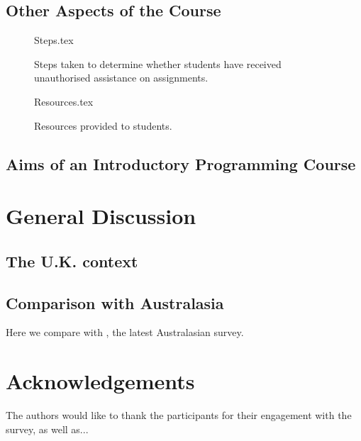 \documentclass{sig-alternate}
\begin{document}
\subsection{Other Aspects of the Course}

\begin{figure}
\begin{center}
{Steps.tex}
\end{center}
\caption{Steps taken to determine whether students have received unauthorised assistance on assignments.}
\end{figure}

\begin{figure}
\begin{center}
{Resources.tex}
\end{center}
\caption{Resources provided to students.}
\end{figure}
\subsection{Aims of an Introductory Programming Course}


\section{General Discussion}\label{discussion}

\subsection{The U.K. context}

\subsection{Comparison with Australasia}
Here we compare with \cite{mason+cooper:2014}, the latest Australasian survey.


\section{Acknowledgements}

The authors would like to thank the participants for their engagement
with the survey, as well as...



\end{document}
